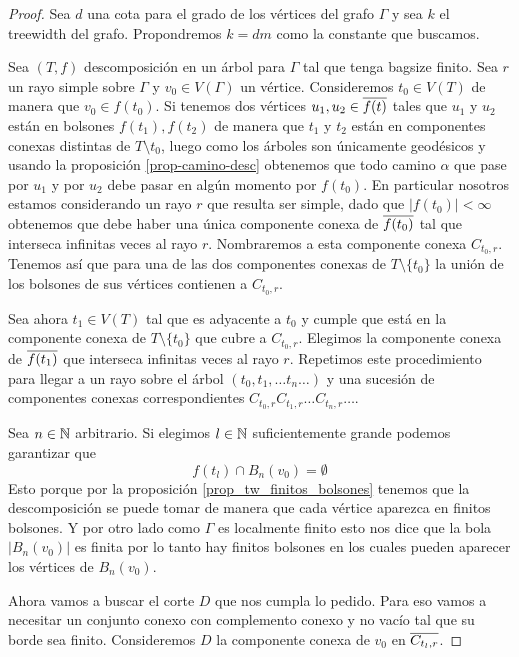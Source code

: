 \documentclass[tesis.tex]{subfiles}
\begin{document}
\begin{proof}
	Sea $d$ una cota para el grado de los vértices del grafo $\Gamma$ y sea $k$ el treewidth del grafo.
	Propondremos $k = dm$ como la constante que buscamos.
	
	Sea $(T,f)$ descomposición en un árbol para $\Gamma$ tal que tenga bagsize finito.
	Sea $r$ un rayo simple sobre $\Gamma$ y $v_{0} \in V(\Gamma)$ un vértice.
	Consideremos $t_0 \in V(T)$ de manera que $v_0 \in f(t_{0})$.
	Si tenemos dos vértices $u_1,u_2 \in \overline{ f(t)}$ tales que $u_1$ y $u_2$ están en bolsones $f(t_{1}), f(t_{2})$ de manera que $t_1$ y $t_2$ están en componentes conexas distintas de $T \setminus t_0$, luego como los árboles son únicamente geodésicos y usando la proposición \ref{prop-camino-desc} obtenemos que todo camino $\alpha$ que pase por $u_1$ y por $u_2$ debe pasar en algún momento por $f(t_{0})$.
	En particular nosotros estamos considerando un rayo $r$ que resulta ser simple, dado que  $|f({t_0})| < \infty$ obtenemos que debe haber una única componente conexa de $\overline{f({t_0})}$ tal que interseca infinitas veces al rayo $r$.
	Nombraremos a esta componente conexa $C_{t_0,r}$.
	Tenemos así que para una de las dos componentes conexas de $T \setminus \{t_{0}\}$ la unión de los bolsones de sus vértices contienen a $C_{t_{0},r}$.
	
	Sea ahora $t_{1} \in V(T)$ tal que es adyacente a $t_{0}$ y cumple que está en la componente conexa de $T \setminus \{t_{0}\}$ que cubre a $C_{t_{0},r}$.  
	Elegimos la componente conexa de $\overline{f(t_{1})}$ que interseca infinitas veces al rayo $r$.
	Repetimos este procedimiento para llegar a un rayo sobre el árbol
	$(t_0,t_1, \dots t_n \dots)$ y una sucesión de componentes conexas correspondientes $C_{t_0,r} C_{t_1,r} \dots C_{t_n, r} \dots$.
	
	Sea $n \in \mathbb{N}$ arbitrario. 
	Si elegimos $l \in \mathbb{N}$ suficientemente grande podemos garantizar que
	\[
	f({t_l}) \cap B_n(v_0) = \emptyset
	\]
	Esto porque por la proposición \ref{prop_tw_finitos_bolsones} tenemos que la descomposición se puede tomar de manera que cada vértice aparezca en finitos bolsones.
	Y por otro lado como $\Gamma$ es localmente finito esto nos dice que la bola $|B_n(v_0)|$ es finita por lo tanto hay finitos bolsones en los cuales pueden aparecer los vértices de $B_{n}(v_{0})$.
	
	
	Ahora vamos a buscar el corte $D$ que nos cumpla lo pedido.
	Para eso vamos a necesitar un conjunto conexo con complemento conexo y no vacío tal que su borde sea finito.
	Consideremos $D$ la componente conexa de $v_0$ en $\overline{ C_{t_l, r}}$.
	

\end{proof}
\end{document}
